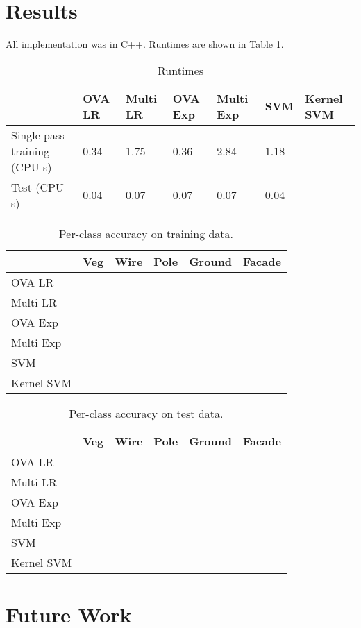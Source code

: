 \documentclass[a4paper]{article}
\begin{document}
\section{Results}
All implementation was in C++. Runtimes are shown in Table \ref{table:runtimes}.

\begin{table}[h]
\centering
\begin{tabular}{|l|l|l|l|l|l|l|}
\hline
& OVA LR & Multi LR & OVA Exp & Multi Exp & SVM & Kernel SVM \\ \hline
Single pass training (CPU s) & 0.34 & 1.75 & 0.36 & 2.84 & 1.18 &  \\ \hline
Test (CPU s) & 0.04 & 0.07 & 0.07 & 0.07 & 0.04 &  \\ \hline
\end{tabular}
\caption{Runtimes}
\label{table:runtimes}
\end{table}

\begin{table}[h]
\centering
\begin{tabular}{|l|l|l|l|l|l|}
\hline
 & Veg & Wire & Pole & Ground & Facade \\
\hline
OVA LR &  &  &  &  &  \\
\hline
Multi LR &  &  &  &  &  \\
\hline
OVA Exp &  &  &  &  &  \\
\hline
Multi Exp &  &  &  &  &  \\
\hline
SVM &  &  &  &  &  \\
\hline
Kernel SVM &  &  &  &  & \\
\hline
\end{tabular}
\caption{Per-class accuracy on training data.}
\end{table}

\begin{table}[h]
\centering
\begin{tabular}{|l|l|l|l|l|l|}
\hline
 & Veg & Wire & Pole & Ground & Facade \\
\hline
OVA LR &  &  &  &  &  \\
\hline
Multi LR &  &  &  &  &  \\
\hline
OVA Exp &  &  &  &  &  \\
\hline
Multi Exp &  &  &  &  &  \\
\hline
SVM &  &  &  &  &  \\
\hline
Kernel SVM &  &  &  &  & \\
\hline
\end{tabular}
\caption{Per-class accuracy on test data.}
\end{table}

\section{Future Work}

\begin{thebibliography}{10}
\end{thebibliography}
\end{document}
